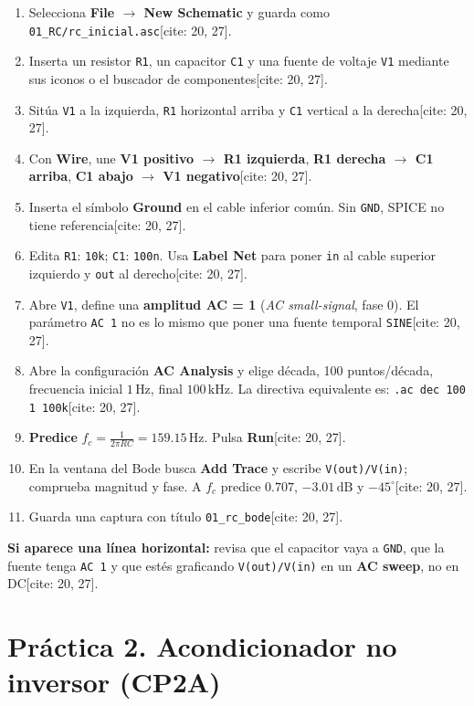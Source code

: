 \documentclass[10pt, a4paper]{article}
\begin{document}
\begin{enumerate}[noitemsep, leftmargin=*]
    \item Selecciona \textbf{File $\to$ New Schematic} y guarda como \texttt{01\_RC/rc\_inicial.asc}[cite: 20, 27].
    \item Inserta un resistor \texttt{R1}, un capacitor \texttt{C1} y una fuente de voltaje \texttt{V1} mediante sus iconos o el buscador de componentes[cite: 20, 27].
    \item Sitúa \texttt{V1} a la izquierda, \texttt{R1} horizontal arriba y \texttt{C1} vertical a la derecha[cite: 20, 27].
    \item Con \textbf{Wire}, une \textbf{V1 positivo $\to$ R1 izquierda}, \textbf{R1 derecha $\to$ C1 arriba}, \textbf{C1 abajo $\to$ V1 negativo}[cite: 20, 27].
    \item Inserta el símbolo \textbf{Ground} en el cable inferior común. Sin \texttt{GND}, SPICE no tiene referencia[cite: 20, 27].
    \item Edita \texttt{R1}: \texttt{10k}; \texttt{C1}: \texttt{100n}. Usa \textbf{Label Net} para poner \texttt{in} al cable superior izquierdo y \texttt{out} al derecho[cite: 20, 27].
    \item Abre \texttt{V1}, define una \textbf{amplitud AC = 1} (\textit{AC small-signal}, fase 0). El parámetro \texttt{AC 1} no es lo mismo que poner una fuente temporal \texttt{SINE}[cite: 20, 27].
    \item Abre la configuración \textbf{AC Analysis} y elige década, 100 puntos/década, frecuencia inicial $1\,\text{Hz}$, final $100\,\text{kHz}$. La directiva equivalente es: \texttt{.ac dec 100 1 100k}[cite: 20, 27].
    \item \textbf{Predice} $f_c = \frac{1}{2\pi RC} = 159.15\,\text{Hz}$. Pulsa \textbf{Run}[cite: 20, 27].
    \item En la ventana del Bode busca \textbf{Add Trace} y escribe \texttt{V(out)/V(in)}; comprueba magnitud y fase. A $f_c$ predice $0.707$, $-3.01\,\text{dB}$ y $-45^\circ$[cite: 20, 27].
    \item Guarda una captura con título \texttt{01\_rc\_bode}[cite: 20, 27].
\end{enumerate}

\textbf{Si aparece una línea horizontal:} revisa que el capacitor vaya a \texttt{GND}, que la fuente tenga \texttt{AC 1} y que estés graficando \texttt{V(out)/V(in)} en un \textbf{AC sweep}, no en DC[cite: 20, 27].

\newpage
\section{Práctica 2. Acondicionador no inversor (CP2A)}
\end{document}
